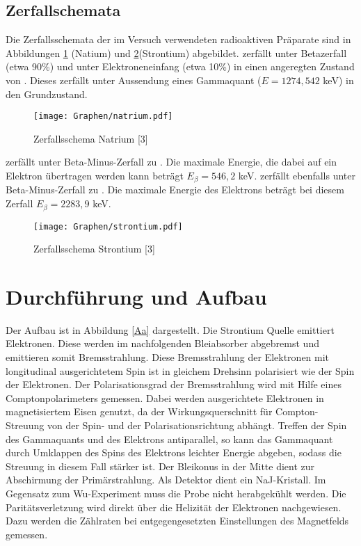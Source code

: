 \documentclass[twoside,colorback,accentcolor=tud4c,11pt]{tudreport}
\begin{document}
\section{Zerfallschemata}
Die Zerfallsschemata der im Versuch verwendeten radioaktiven Präparate sind in Abbildungen \ref{V_2.8a} (Natium) und \ref{V_2.8b}(Strontium) abgebildet.  zerfällt unter Betazerfall (etwa 90\%) und unter Elektroneneinfang (etwa 10\%) in einen angeregten Zustand von . Dieses zerfällt unter Aussendung eines Gammaquant ($E=1274,542$ keV) in den Grundzustand.
\begin{figure}[H]
\centering
   	\begin{minipage}[b]{0.7\textwidth}
   	\texttt{[image: Graphen/natrium.pdf]}
   	\caption{Zerfallsschema Natrium [3]}
  	\label{V_2.8a}
   	\end{minipage}
\end{figure}
 zerfällt unter Beta-Minus-Zerfall zu . Die maximale Energie, die dabei auf ein Elektron übertragen werden kann beträgt $E_{\beta}=546,2$ keV.  zerfällt ebenfalls unter Beta-Minus-Zerfall zu . Die maximale Energie des Elektrons beträgt bei diesem Zerfall $E_{\beta}=2283,9$ keV.
\begin{figure}[H]
\centering
   	\begin{minipage}[b]{0.7\textwidth}
   	\texttt{[image: Graphen/strontium.pdf]}
   	\caption{Zerfallsschema Strontium [3]}
  	\label{V_2.8b}
   	\end{minipage}
\end{figure}
	
	
\chapter{Durchführung und Aufbau}
Der Aufbau ist in Abbildung \ref{Aa} dargestellt. Die Strontium Quelle emittiert Elektronen. Diese werden im nachfolgenden Bleiabsorber abgebremst und emittieren somit Bremsstrahlung. Diese Bremsstrahlung der Elektronen mit longitudinal ausgerichtetem Spin ist in gleichem Drehsinn polarisiert wie der Spin der Elektronen. Der Polarisationsgrad der Bremsstrahlung wird mit Hilfe eines Comptonpolarimeters gemessen. Dabei werden ausgerichtete Elektronen in magnetisiertem Eisen genutzt, da der Wirkungsquerschnitt für Compton-Streuung von der Spin- und der Polarisationsrichtung abhängt. Treffen der Spin des Gammaquants und des Elektrons antiparallel, so kann das Gammaquant durch Umklappen des Spins des Elektrons leichter Energie abgeben, sodass die Streuung in diesem Fall stärker ist. Der Bleikonus in der Mitte dient zur Abschirmung der Primärstrahlung. Als Detektor dient ein NaJ-Kristall. Im Gegensatz zum Wu-Experiment muss die Probe nicht herabgekühlt werden. Die Paritätsverletzung wird direkt über die Helizität der Elektronen nachgewiesen. Dazu werden die Zählraten bei entgegengesetzten Einstellungen des Magnetfelds gemessen.
\end{document}
